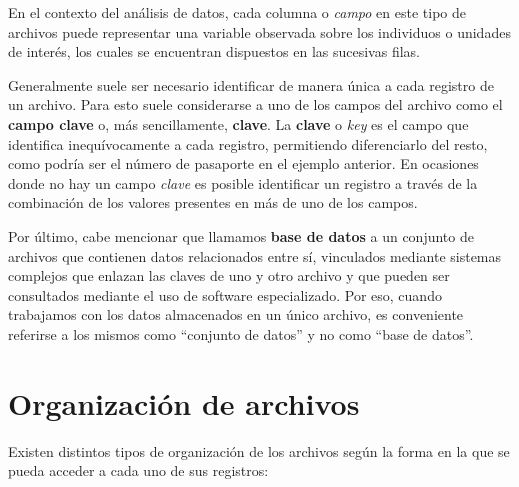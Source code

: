 \documentclass[
]{book}
\begin{document}
En el contexto del análisis de datos, cada columna o \emph{campo} en este tipo de archivos puede representar una variable observada sobre los individuos o unidades de interés, los cuales se encuentran dispuestos en las sucesivas filas.

Generalmente suele ser necesario identificar de manera única a cada registro de un archivo. Para esto suele considerarse a uno de los campos del archivo como el \textbf{campo clave} o, más sencillamente, \textbf{clave}. La \textbf{clave} o \emph{key} es el campo que identifica inequívocamente a cada registro, permitiendo diferenciarlo del resto, como podría ser el número de pasaporte en el ejemplo anterior. En ocasiones donde no hay un campo \emph{clave} es posible identificar un registro a través de la combinación de los valores presentes en más de uno de los campos.

Por último, cabe mencionar que llamamos \textbf{base de datos} a un conjunto de archivos que contienen datos relacionados entre sí, vinculados mediante sistemas complejos que enlazan las claves de uno y otro archivo y que pueden ser consultados mediante el uso de software especializado. Por eso, cuando trabajamos con los datos almacenados en un único archivo, es conveniente referirse a los mismos como ``conjunto de datos'' y no como ``base de datos''.

\hypertarget{organizaciuxf3n-de-archivos}{%
\section{Organización de archivos}\label{organizaciuxf3n-de-archivos}}

Existen distintos tipos de organización de los archivos según la forma en la que se pueda acceder a cada uno de sus registros:
\end{document}
